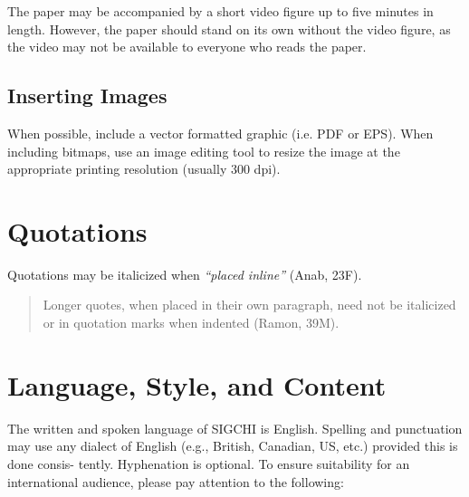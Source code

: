 \documentclass{sigchi}
\begin{document}
The paper may be accompanied by a short video figure up to five
minutes in length. However, the paper should stand on its own without
the video figure, as the video may not be available to everyone who
reads the paper.  

\subsection{Inserting Images}
When possible, include a vector formatted graphic (i.e. PDF or EPS).
When including bitmaps,  use an image editing tool to resize the image
at the appropriate printing resolution (usually 300 dpi).

\section{Quotations}
Quotations may be italicized when \textit{``placed inline''} (Anab,
23F).

\begin{quote}
Longer quotes, when placed in their own paragraph, need not be
italicized or in quotation marks when indented (Ramon, 39M).  
\end{quote}

\section{Language, Style, and Content}

The written and spoken language of SIGCHI is English. Spelling and
punctuation may use any dialect of English (e.g., British, Canadian,
US, etc.) provided this is done consis- tently. Hyphenation is
optional. To ensure suitability for an international audience, please
pay attention to the following:
\end{document}
